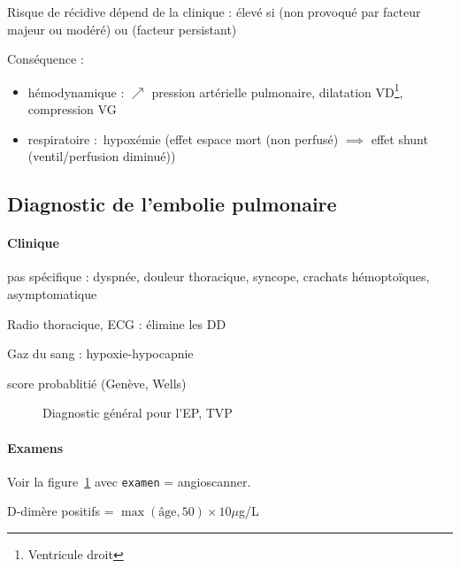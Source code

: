 Risque de récidive dépend de la clinique : élevé si (non provoqué par facteur
majeur ou modéré) ou (\og facteur persistant)

Conséquence :
\begin{itemize}
\item hémodynamique : $\nearrow$ pression artérielle pulmonaire, dilatation
  VD\footnote{Ventricule droit}, compression VG
\item respiratoire : hypoxémie (effet espace mort (non perfusé) $\implies$ effet shunt
  (ventil/perfusion diminué))
\end{itemize}

\subsection{Diagnostic de l'embolie pulmonaire}

\paragraph{Clinique} pas spécifique : dyspnée, douleur thoracique, syncope,
crachats hémoptoïques, asymptomatique

Radio thoracique, ECG : élimine les DD

Gaz du sang : hypoxie-hypocapnie

\thus score probablitié (Genève, Wells)

\begin{figure}[htpb]
  \centering
  \caption{Diagnostic général pour l'EP, TVP}
  \label{fig:ep-diag}
\end{figure}


\paragraph{Examens}
Voir la figure~\ref{fig:ep-diag} avec \texttt{examen} = angioscanner.

D-dimère positifs = $\max(\text{âge}, 50) \times 10 \mu{}$g/L

